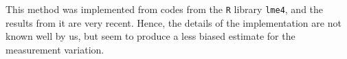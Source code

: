 \documentclass[landscape,a0paper,fontscale=0.285]{baposter} %
\begin{document}
\begin{poster}
{This method was implemented from codes from the \texttt{R} library
\texttt{lme4}, and the results from it are very recent.  Hence, the details of
the implementation are not known well by us, but seem to produce a less
biased estimate for the measurement variation. }


\end{poster}
\end{document}
